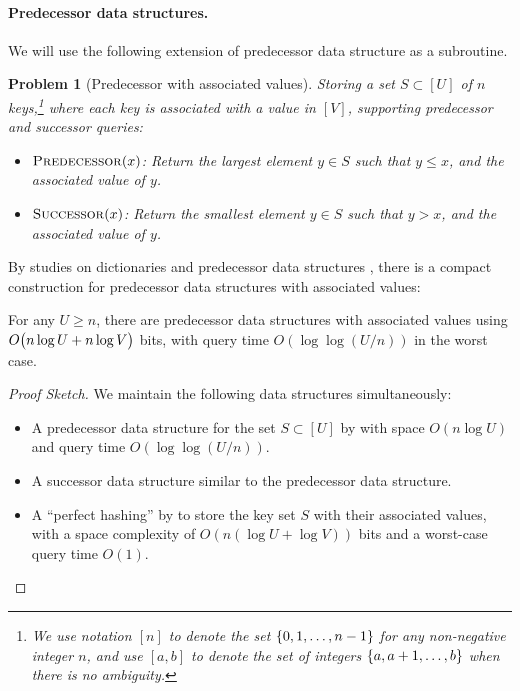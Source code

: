 \documentclass{article}
\theoremstyle{plain}
\newtheorem{prob}{Problem}  \newtheorem{open}[prob]{Open Question}
\theoremstyle{definition}  \newtheorem{definition}[theorem]{Definition}
\DeclarePairedDelimiter{\bk}{(}{)}
\DeclarePairedDelimiter{\BK}{\{}{\}}
\begin{document}
\paragraph*{Predecessor data structures.}
We will use the following extension of predecessor data structure as a subroutine.

\begin{prob}[Predecessor with associated values]
  Storing a set $S \subset [U]$ of $n$ keys,\footnote{We use notation $[n]$ to denote the set $\BK{0,1,\ldots,n-1}$ for any non-negative integer $n$, and use $[a, b]$ to denote the set of integers $\BK{a, a+1, \dots, b}$ when there is no ambiguity.} where each key is associated with a value in $[V]$, supporting predecessor and successor queries:
  \begin{itemize}
  \item $\textup{\textsc{Predecessor}}(x)$: Return the largest element $y \in S$ such that $y \le x$, and the associated value of $y$.
  \item $\textup{\textsc{Successor}}(x)$: Return the smallest element $y \in S$ such that $y > x$, and the associated value of $y$.
  \end{itemize}   
\end{prob}
By studies on dictionaries \cite{fredman1984storing} and predecessor data structures \cite{patrascu2006timespace}, there is a compact construction for predecessor data structures with associated values:
\begin{lemma}
  \label{lm:predecessor}
  For any $U \ge n$, there are predecessor data structures with associated values using $O\bk[\big]{n\log U + n \log V}$ bits, with query time $O(\log \log (U/n))$ in the worst case.
\end{lemma}
\begin{proof}[Proof Sketch] We maintain the following data structures simultaneously:
  \begin{itemize}
  \item A predecessor data structure for the set $S \subset [U]$ by \cite{patrascu2006timespace} with space $O(n \log U)$ and query time $O(\log \log (U/n))$.
  \item A successor data structure similar to the predecessor data structure.
  \item A ``perfect hashing'' by \cite{fredman1984storing,cormen2022introduction} to store the key set $S$ with their associated values, with a space complexity of $O(n (\log U + \log V))$ bits and a worst-case query time $O(1)$.\qedhere
  \end{itemize}
\end{proof}
\end{document}
